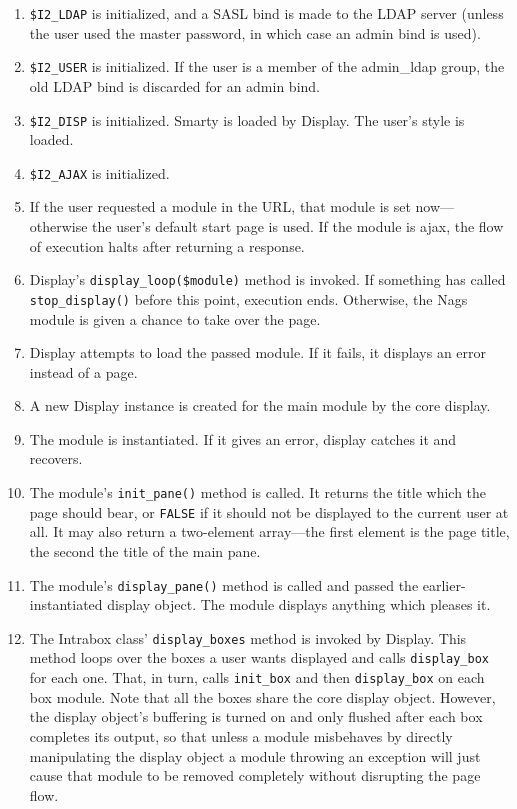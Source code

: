 \documentclass[11pt,letterpaper]{report}
\begin{document}
\begin{enumerate}
	\item \lstinline{$I2_LDAP} is initialized, and a SASL bind is made to
		the LDAP server (unless the user used the master password, in
		which case an admin bind is used).
	\item \lstinline{$I2_USER} is initialized.  If the user is a member
		of the admin\_ldap group, the old LDAP bind is discarded
		for an admin bind.
	\item \lstinline{$I2_DISP} is initialized.  Smarty is loaded by Display.  The user's
		style is loaded.
	\item \lstinline{$I2_AJAX} is initialized.
	\item If the user requested a module in the URL, that module
		is set now---otherwise the user's default start page is used.
		If the module is ajax, the flow of execution halts after
		returning a response.
	\item Display's \lstinline{display_loop($module)} method is invoked.  If
		something has called \lstinline{stop_display()} before this point,
		execution ends.  Otherwise, the Nags module is given a chance to
		take over the page.
	\item Display attempts to load the passed module.  If it fails, it
		displays an error instead of a page.
	\item A new Display instance is created for the main module by the core display.
	\item The module is instantiated.  If it gives an error, display catches it and
		recovers.
	
	\item The module's \lstinline{init_pane()} method is called.  It returns the
		title which the page should bear, or \lstinline{FALSE} if it should
		not be displayed to the current user at all.  It may also return
		a two-element array---the first element is the page title, the second
		the title of the main pane.
	\item The module's \lstinline{display_pane()} method is called and passed
		the earlier-instantiated display object.  The module displays
		anything which pleases it.
	\item The Intrabox class' \lstinline{display_boxes} method is invoked by Display.
		This method loops over the boxes a user wants displayed and calls
		\lstinline{display_box} for each one.  That, in turn, calls \lstinline{init_box}
		and then \lstinline{display_box} on each box module.  Note that all the
		boxes share the core display object.  However, the display object's
		buffering is turned on and only flushed after each box completes its output,
		so that unless a module misbehaves by directly manipulating the display object
		a module throwing an exception will just cause that module to be removed
		completely without disrupting the page flow.
\end{enumerate}
\end{document}

